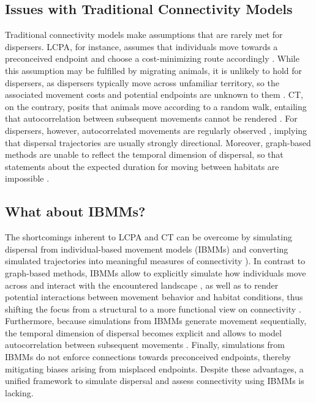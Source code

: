 \documentclass[abstract=on,10pt,a4paper,bibliography=totocnumbered]{article}
\begin{document}
\subsection{Issues with Traditional Connectivity Models}
Traditional connectivity models make assumptions that are rarely met for
dispersers. LCPA, for instance, assumes that individuals move towards a
preconceived endpoint and choose a cost-minimizing route accordingly
\citep{Sawyer.2011, Abrahms.2017}. While this assumption may be fulfilled by
migrating animals, it is unlikely to hold for dispersers, as dispersers
typically move across unfamiliar territory, so the associated movement costs and
potential endpoints are unknown to them \citep{Koen.2014, Cozzi.2020}. CT, on
the contrary, posits that animals move according to a random walk, entailing
that autocorrelation between subsequent movements cannot be rendered
\citep{Diniz.2019}. For dispersers, however, autocorrelated movements are
regularly observed \citep{Cozzi.2020, Hofmann.2021}, implying that dispersal
trajectories are usually strongly directional. Moreover, graph-based methods are
unable to reflect the temporal dimension of dispersal, so that statements about
the expected duration for moving between habitats are impossible
\citep{Martensen.2017, Diniz.2019}.

\subsection{What about IBMMs?}
The shortcomings inherent to LCPA and CT can be overcome by simulating dispersal
from individual-based movement models (IBMMs) and converting simulated
trajectories into meaningful measures of connectivity \citep{Diniz.2019}). In
contrast to graph-based methods, IBMMs allow to explicitly simulate how
individuals move across and interact with the encountered landscape
\citep{Kanagaraj.2013, Clark.2015, Allen.2016, Hauenstein.2019, Zeller.2020}, as
well as to render potential interactions between movement behavior and habitat
conditions, thus shifting the focus from a structural to a more functional view
on connectivity \citep{Tischendorf.2000, Kanagaraj.2013, Hauenstein.2019}.
Furthermore, because simulations from IBMMs generate movement sequentially, the
temporal dimension of dispersal becomes explicit and allows to model
autocorrelation between subsequent movements \citep{Diniz.2019}. Finally,
simulations from IBMMs do not enforce connections towards preconceived
endpoints, thereby mitigating biases arising from misplaced endpoints. Despite
these advantages, a unified framework to simulate dispersal and assess
connectivity using IBMMs is lacking.
\end{document}

